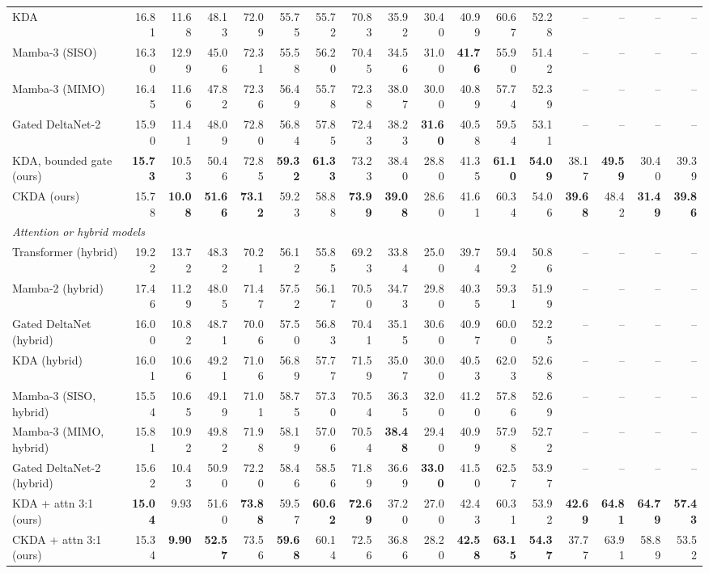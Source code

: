 \begin{table}[t]
\begin{tabular}{lrrrrrrrrrrrrrrrr}
    KDA & 16.81 & 11.68 & 48.13 & 72.09 & 55.75 & 55.72 & 70.83 & 35.92 & 30.40 & 40.99 & 60.67 & 52.28 & -- & -- & -- & -- \\
    Mamba-3 (SISO) & 16.30 & 12.99 & 45.06 & 72.31 & 55.58 & 56.20 & 70.45 & 34.56 & 31.00 & \textbf{41.76} & 55.90 & 51.42 & -- & -- & -- & -- \\
    Mamba-3 (MIMO) & 16.45 & 11.66 & 47.82 & 72.36 & 56.49 & 55.78 & 72.38 & 38.07 & 30.00 & 40.89 & 57.74 & 52.39 & -- & -- & -- & -- \\
    Gated DeltaNet-2 & 15.90 & 11.41 & 48.09 & 72.80 & 56.84 & 57.85 & 72.43 & 38.23 & \textbf{31.60} & 40.58 & 59.54 & 53.11 & -- & -- & -- & -- \\
    KDA, bounded gate (ours) & \textbf{15.73} & 10.53 & 50.46 & 72.85 & \textbf{59.32} & \textbf{61.33} & 73.23 & 38.40 & 28.80 & 41.35 & \textbf{61.10} & \textbf{54.09} & 38.17 & \textbf{49.59} & 30.40 & 39.39 \\
    CKDA (ours) & 15.78 & \textbf{10.08} & \textbf{51.66} & \textbf{73.12} & 59.23 & 58.88 & \textbf{73.99} & \textbf{39.08} & 28.60 & 41.61 & 60.34 & 54.06 & \textbf{39.68} & 48.42 & \textbf{31.49} & \textbf{39.86} \\
    \midrule
    \multicolumn{17}{l}{\textit{Attention or hybrid models}} \\
    Transformer (hybrid) & 19.22 & 13.72 & 48.32 & 70.21 & 56.12 & 55.85 & 69.23 & 33.84 & 25.00 & 39.74 & 59.42 & 50.86 & -- & -- & -- & -- \\
    Mamba-2 (hybrid) & 17.46 & 11.29 & 48.05 & 71.47 & 57.52 & 56.17 & 70.50 & 34.73 & 29.80 & 40.35 & 59.31 & 51.99 & -- & -- & -- & -- \\
    Gated DeltaNet (hybrid) & 16.00 & 10.82 & 48.71 & 70.06 & 57.50 & 56.83 & 70.41 & 35.15 & 30.60 & 40.97 & 60.00 & 52.25 & -- & -- & -- & -- \\
    KDA (hybrid) & 16.01 & 10.66 & 49.21 & 71.06 & 56.89 & 57.77 & 71.59 & 35.07 & 30.00 & 40.53 & 62.03 & 52.68 & -- & -- & -- & -- \\
    Mamba-3 (SISO, hybrid) & 15.54 & 10.65 & 49.19 & 71.01 & 58.75 & 57.30 & 70.54 & 36.35 & 32.00 & 41.20 & 57.86 & 52.69 & -- & -- & -- & -- \\
    Mamba-3 (MIMO, hybrid) & 15.81 & 10.92 & 49.82 & 71.98 & 58.19 & 57.06 & 70.54 & \textbf{38.48} & 29.40 & 40.99 & 57.98 & 52.72 & -- & -- & -- & -- \\
    Gated DeltaNet-2 (hybrid) & 15.62 & 10.43 & 50.90 & 72.20 & 58.46 & 58.56 & 71.89 & 36.69 & \textbf{33.00} & 41.50 & 62.57 & 53.97 & -- & -- & -- & -- \\
    KDA + attn 3:1 (ours) & \textbf{15.04} & 9.93 & 51.60 & \textbf{73.88} & 59.57 & \textbf{60.62} & \textbf{72.69} & 37.20 & 27.00 & 42.43 & 60.31 & 53.92 & \textbf{42.69} & \textbf{64.81} & \textbf{64.79} & \textbf{57.43} \\
    CKDA + attn 3:1 (ours) & 15.34 & \textbf{9.90} & \textbf{52.57} & 73.56 & \textbf{59.68} & 60.14 & 72.56 & 36.86 & 28.20 & \textbf{42.58} & \textbf{63.15} & \textbf{54.37} & 37.77 & 63.91 & 58.89 & 53.52 \\
    \bottomrule
  \end{tabular}
\end{table}
